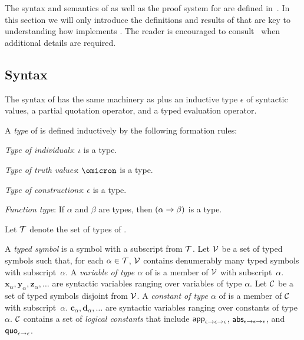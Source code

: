 \documentclass[fleqn]{llncs}
\begin{document}
The syntax and semantics of {\churchqe} as well as the proof system
for {\churchqe} are defined in~\cite{FarmerArxiv16}.  In this section
we will only introduce the definitions and results of {\churchqe} that
are key to understanding how \HLQE{} implements {\churchqe}.  The
reader is encouraged to consult~\cite{FarmerArxiv16} when additional
details are required.

\subsection{Syntax}

The syntax of {\churchqe} has the same machinery as {\qzero} plus an
inductive type $\epsilon$ of syntactic values, a partial quotation
operator, and a typed evaluation operator.

A \emph{type} of {\churchqe} is defined inductively by the following
formation rules:
%
\be

  \item \emph{Type of individuals}: $\iota$ is a type.

  \item \emph{Type of truth values}: $\omicron$ is a type.

  \item \emph{Type of constructions}: $\epsilon$ is a type.

  \item \emph{Function type}: If $\alpha$ and $\beta$ are types, then
    $(\alpha \rightarrow \beta)$ is a type.

\ee

\noindent
Let $\mbox{$\cal T$}$ denote the set of types of {\churchqe}.  

A \emph{typed symbol} is a symbol with a subscript from $\mbox{$\cal T$}$.  Let
$\mbox{$\cal V$}$ be a set of typed symbols such that, for each $\alpha \in \mbox{$\cal T$}$,
$\mbox{$\cal V$}$ contains denumerably many typed symbols with subscript~$\alpha$.
A \emph{variable of type $\alpha$} of {\churchqe} is a member of $\mbox{$\cal V$}$
with subscript~$\alpha$.  $\textbf{x}_\alpha, \textbf{y}_\alpha,
\textbf{z}_\alpha, \ldots$ are syntactic variables ranging over
variables of type $\alpha$. Let $\mbox{$\cal C$}$ be a set of typed symbols
disjoint from $\mbox{$\cal V$}$.  A \emph{constant of type $\alpha$} of
{\churchqe} is a member of $\mbox{$\cal C$}$ with subscript~$\alpha$.
$\textbf{c}_\alpha, \textbf{d}_\alpha, \ldots$ are syntactic variables
ranging over constants of type~$\alpha$.  $\mbox{$\cal C$}$ contains a set of
\emph{logical constants} that include $\mbox{\sf app}_{\epsilon \rightarrow
  \epsilon \rightarrow \epsilon}$, $\mbox{\sf abs}_{\epsilon \rightarrow \epsilon
  \rightarrow \epsilon}$, and $\mbox{\sf quo}_{\epsilon \rightarrow \epsilon}$.
\end{document}
